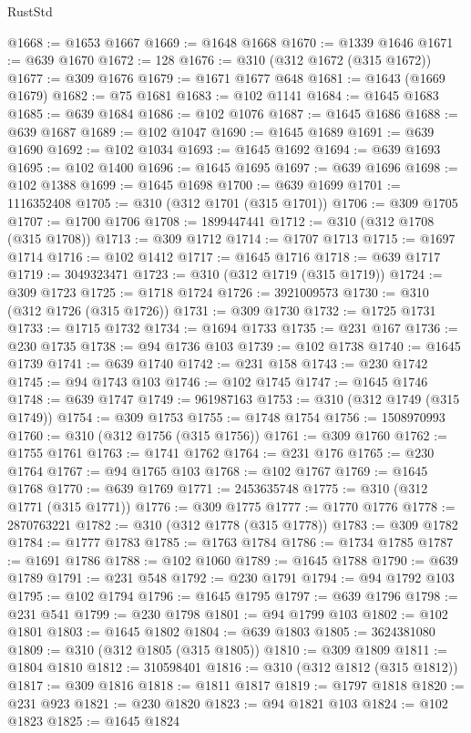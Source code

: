 \begin{lexlean}{RustStd}
\begin{coremodule}
@1668 := @1653 @1667
@1669 := @1648 @1668
@1670 := @1339 @1646
@1671 := @639 @1670
@1672 := 128
@1676 := @310 (@312 @1672 (@315 @1672))
@1677 := @309 @1676
@1679 := @1671 @1677 @648
@1681 := @1643 (@1669 @1679)
@1682 := @75 @1681
@1683 := @102 @1141
@1684 := @1645 @1683
@1685 := @639 @1684
@1686 := @102 @1076
@1687 := @1645 @1686
@1688 := @639 @1687
@1689 := @102 @1047
@1690 := @1645 @1689
@1691 := @639 @1690
@1692 := @102 @1034
@1693 := @1645 @1692
@1694 := @639 @1693
@1695 := @102 @1400
@1696 := @1645 @1695
@1697 := @639 @1696
@1698 := @102 @1388
@1699 := @1645 @1698
@1700 := @639 @1699
@1701 := 1116352408
@1705 := @310 (@312 @1701 (@315 @1701))
@1706 := @309 @1705
@1707 := @1700 @1706
@1708 := 1899447441
@1712 := @310 (@312 @1708 (@315 @1708))
@1713 := @309 @1712
@1714 := @1707 @1713
@1715 := @1697 @1714
@1716 := @102 @1412
@1717 := @1645 @1716
@1718 := @639 @1717
@1719 := 3049323471
@1723 := @310 (@312 @1719 (@315 @1719))
@1724 := @309 @1723
@1725 := @1718 @1724
@1726 := 3921009573
@1730 := @310 (@312 @1726 (@315 @1726))
@1731 := @309 @1730
@1732 := @1725 @1731
@1733 := @1715 @1732
@1734 := @1694 @1733
@1735 := @231 @167
@1736 := @230 @1735
@1738 := @94 @1736 @103
@1739 := @102 @1738
@1740 := @1645 @1739
@1741 := @639 @1740
@1742 := @231 @158
@1743 := @230 @1742
@1745 := @94 @1743 @103
@1746 := @102 @1745
@1747 := @1645 @1746
@1748 := @639 @1747
@1749 := 961987163
@1753 := @310 (@312 @1749 (@315 @1749))
@1754 := @309 @1753
@1755 := @1748 @1754
@1756 := 1508970993
@1760 := @310 (@312 @1756 (@315 @1756))
@1761 := @309 @1760
@1762 := @1755 @1761
@1763 := @1741 @1762
@1764 := @231 @176
@1765 := @230 @1764
@1767 := @94 @1765 @103
@1768 := @102 @1767
@1769 := @1645 @1768
@1770 := @639 @1769
@1771 := 2453635748
@1775 := @310 (@312 @1771 (@315 @1771))
@1776 := @309 @1775
@1777 := @1770 @1776
@1778 := 2870763221
@1782 := @310 (@312 @1778 (@315 @1778))
@1783 := @309 @1782
@1784 := @1777 @1783
@1785 := @1763 @1784
@1786 := @1734 @1785
@1787 := @1691 @1786
@1788 := @102 @1060
@1789 := @1645 @1788
@1790 := @639 @1789
@1791 := @231 @548
@1792 := @230 @1791
@1794 := @94 @1792 @103
@1795 := @102 @1794
@1796 := @1645 @1795
@1797 := @639 @1796
@1798 := @231 @541
@1799 := @230 @1798
@1801 := @94 @1799 @103
@1802 := @102 @1801
@1803 := @1645 @1802
@1804 := @639 @1803
@1805 := 3624381080
@1809 := @310 (@312 @1805 (@315 @1805))
@1810 := @309 @1809
@1811 := @1804 @1810
@1812 := 310598401
@1816 := @310 (@312 @1812 (@315 @1812))
@1817 := @309 @1816
@1818 := @1811 @1817
@1819 := @1797 @1818
@1820 := @231 @923
@1821 := @230 @1820
@1823 := @94 @1821 @103
@1824 := @102 @1823
@1825 := @1645 @1824

\end{coremodule}
\end{lexlean}
